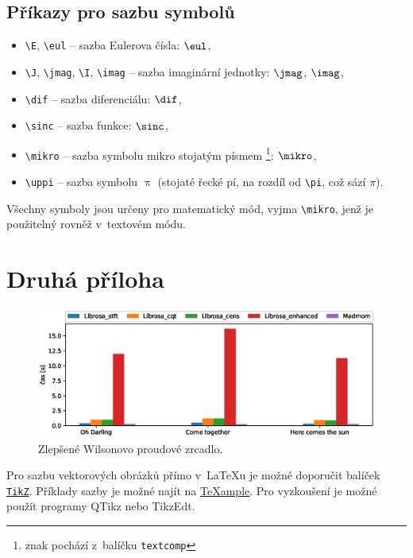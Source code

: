 \section{Příkazy pro sazbu symbolů}

\begin{itemize}
  \item
    \verb|\E|, \verb|\eul| -- sazba Eulerova čísla: $\eul$,
  \item
    \verb|\J|, \verb|\jmag|, \verb|\I|, \verb|\imag| -- sazba imaginární jednotky: $\jmag$, $\imag$,
  \item
    \verb|\dif| -- sazba diferenciálu: $\dif$,
  \item
    \verb|\sinc| -- sazba funkce: $\sinc$,
  \item
    \verb|\mikro| -- sazba symbolu mikro stojatým písmem%
			\footnote{znak pochází z~balíčku \texttt{textcomp}}: $\mikro$,
	\item
		\verb|\uppi| -- sazba symbolu $\uppi$
			(stojaté řecké pí, na rozdíl od \verb|\pi|, což sází $\pi$).
\end{itemize}
%
Všechny symboly jsou určeny pro matematický mód, vyjma \verb|\mikro|, jenž je\\ použitelný rovněž v~textovém módu.


\chapter{Druhá příloha}

\begin{figure}[!h]
  \begin{center}
    \includegraphics[scale=0.5]{obrazky/Chroma_analysis_times_comparison.eps}
  \end{center}
  \caption[Alenčino zrcadlo]{Zlepšené Wilsonovo proudové zrcadlo.}
\end{figure}

Pro sazbu vektorových obrázků přímo v~\LaTeX{}u je možné doporučit balíček \href{https://www.ctan.org/pkg/pgf}{\texttt{TikZ}}.
Příklady sazby je možné najít na \href{http://www.texample.net/tikz/examples/}{\TeX{}ample}.
Pro vyzkoušení je možné použít programy QTikz nebo TikzEdt.




